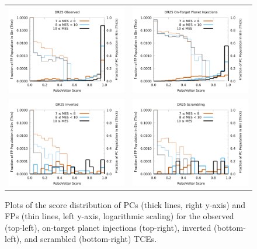 \begin{figure}[ht]
\centering
\begin{tabular}{cc}
\includegraphics[width=0.48\linewidth]{Scores-OBS.png} &
\includegraphics[width=0.48\linewidth]{Scores-INJ1.png} \\
\includegraphics[width=0.48\linewidth]{Scores-INV.png} &
\includegraphics[width=0.48\linewidth]{Scores-SCR1.png} \\
\end{tabular}
\caption{Plots of the score distribution of PCs (thick lines, right y-axis) and FPs (thin lines, left y-axis, logarithmic scaling) for the observed (top-left), on-target planet injections (top-right), inverted (bottom-left), and scrambled (bottom-right) TCEs.}
\label{score-fig-2}
\end{figure}

